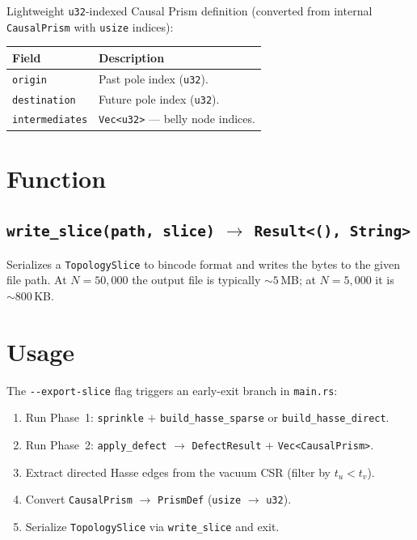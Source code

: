 \documentclass[11pt, a4paper, openany]{book}
\newcommand{\code}[1]{\texttt{#1}}
\newcommand{\func}[1]{\texttt{\color{structure}#1}}
\begin{document}
Lightweight \code{u32}-indexed Causal Prism definition (converted from internal \code{CausalPrism} with \code{usize} indices):

\begin{table}[H]
\centering
\begin{tabular}{@{} l p{9cm} @{}}
\toprule
\textbf{Field} & \textbf{Description} \\
\midrule
\code{origin}        & Past pole index (\code{u32}). \\
\code{destination}   & Future pole index (\code{u32}). \\
\code{intermediates} & \code{Vec<u32>} --- belly node indices. \\
\bottomrule
\end{tabular}
\end{table}

\section{Function}

\subsection{\func{write\_slice(path, slice)} $\to$ \code{Result<(), String>}}

Serializes a \code{TopologySlice} to bincode format and writes the bytes to the given file
path.  At $N = 50{,}000$ the output file is typically ${\sim}5$\,MB; at $N = 5{,}000$ it is
${\sim}800$\,KB.

\section{Usage}

The \code{-{}-export-slice} flag triggers an early-exit branch in \code{main.rs}:
\begin{enumerate}
  \item Run Phase~1: \func{sprinkle} $+$ \func{build\_hasse\_sparse} or \func{build\_hasse\_direct}.
  \item Run Phase~2: \func{apply\_defect} $\to$ \code{DefectResult} $+$ \code{Vec<CausalPrism>}.
  \item Extract directed Hasse edges from the vacuum CSR (filter by $t_u < t_v$).
  \item Convert \code{CausalPrism} $\to$ \code{PrismDef} (\code{usize} $\to$ \code{u32}).
  \item Serialize \code{TopologySlice} via \func{write\_slice} and exit.
\end{enumerate}
\end{document}

